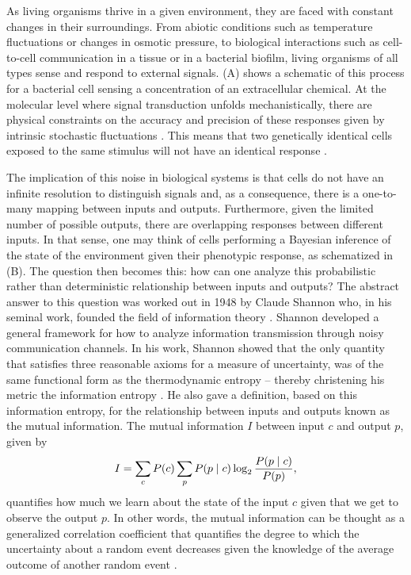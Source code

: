 As living organisms thrive in a given environment, they are faced with
constant changes in their surroundings. From abiotic conditions such as
temperature fluctuations or changes in osmotic pressure, to biological
interactions such as cell-to-cell communication in a tissue or in a bacterial
biofilm, living organisms of all types sense and respond to external signals.
(A) shows a schematic of this process for a bacterial cell
sensing a concentration of an extracellular chemical. At the molecular level
where signal transduction unfolds mechanistically, there are physical
constraints on the accuracy and precision of these responses given by intrinsic
stochastic fluctuations \cite{Nemenman2010}. This means that two genetically
identical cells exposed to the same stimulus will not have an identical
response \cite{Eldar2010}.

The implication of this noise in biological systems is that cells do not have
an infinite resolution to distinguish signals and, as a consequence, there is a
one-to-many mapping between inputs and outputs. Furthermore, given the limited
number of possible outputs, there are overlapping responses between different
inputs. In that sense, one may think of cells performing a Bayesian inference
of the state of the environment given their phenotypic response, as schematized
in (B). The question then becomes this: how can one analyze
this probabilistic rather than deterministic relationship between inputs and
outputs? The abstract answer to this question was worked out in 1948 by Claude
Shannon who, in his seminal work, founded the field of information theory
\cite{Shannon1948}. Shannon developed a general framework for how to analyze
information transmission through noisy communication channels. In his work,
Shannon showed that the only quantity that satisfies three reasonable axioms
for a measure of uncertainty, was of the same functional form as the
thermodynamic entropy -- thereby christening his metric the information entropy
\cite{MacKay2003}. He also gave a definition, based on this information
entropy, for the relationship between inputs and outputs known as the mutual
information. The mutual information $I$ between input $c$ and output $p$, given
by
\begin{equation}
  I = \sum_c P(c) \sum_p P(p \mid c) \log_2 {P(p \mid c) \over P(p)},
	\label{eq_mutual_info}
\end{equation}
quantifies how much we learn about the state of the input $c$ given that we get
to observe the output $p$. In other words, the mutual information can be
thought as a generalized correlation coefficient that quantifies the degree to
which the uncertainty about a random event decreases given the knowledge of the
average outcome of another random event \cite{Kinney2010}.


